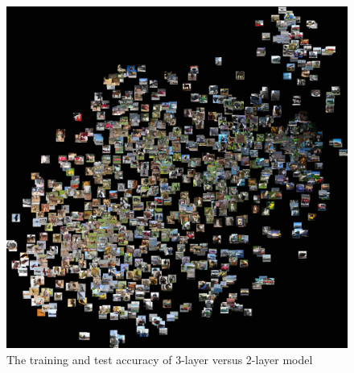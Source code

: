 \documentclass[final]{siamltexmm}
\begin{document}
\begin{figure}[H]
  \centering
    \includegraphics[width=1\textwidth]{../fig/t_SNEIII.jpeg}
  \caption{The training and test accuracy of 3-layer versus 2-layer model}
\end{figure}
\end{document}
